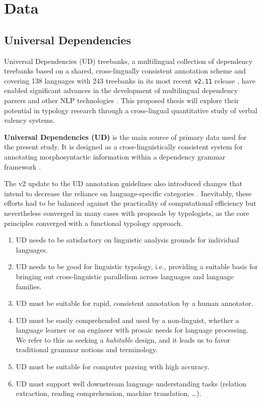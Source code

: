 \chapter{Data}\label{chapter:data}

\section{Universal Dependencies}\label{sec:data_ud}


Universal Dependencies (UD) treebanks, a multilingual collection of dependency treebanks based on a shared, cross-lingually consistent annotation scheme \citep{nivre2020} and covering 138 languages with 243 treebanks in its most recent \texttt{v2.11} release \citep{universaldep}, have enabled significant advances in the development of multilingual dependency parsers and other NLP technologies \citep{zeman2017, zeman2018}. This proposed thesis will explore their potential in typology research through a cross-lingual quantitative study of verbal valency systems.

\textbf{Universal Dependencies (UD)} is the main source of primary data used for the present study. It is designed as a cross-linguistically consistent system for annotating morphosyntactic information within a dependency grammar framework \citep{demarneffe2021}. 

The v2 update to the UD annotation guidelines also introduced changes that intend to decrease the reliance on language-specific categories \citep{nivre2020}. Inevitably, these efforts had to be balanced against the practicality of computational efficiency but nevertheless converged in many cases with proposals by typologists, as the core principles converged with a functional typology approach. \citet{croft2017}

\begin{enumerate}
    \item UD needs to be satisfactory on linguistic analysis grounds for individual languages.
    \item UD needs to be good for linguistic typology, i.e., providing a suitable basis for bringing out cross-linguistic parallelism across languages and language families.
    \item UD must be suitable for rapid, consistent annotation by a human annotator.
    \item UD must be easily comprehended and used by a non-linguist, whether a language learner or an engineer with prosaic needs for language processing. We refer to this as seeking a \textit{habitable} design, and it leads us to favor traditional grammar notions and terminology.
    \item UD must be suitable for computer parsing with high accuracy.
    \item UD must support well downstream language understanding tasks (relation extraction, reading comprehension, machine translation, \dots).
\end{enumerate}

